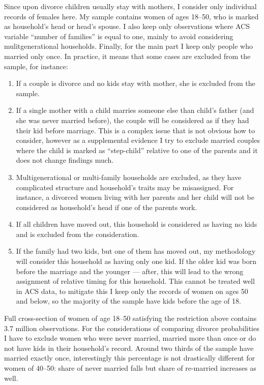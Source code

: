 \documentclass[12pt,letter]{article}
\begin{document}
Since upon divorce children usually stay with mothers, I consider only individual records of females here. My sample contains women of ages 18--50, who is marked as household's head or head's spouse. I also keep only observations where ACS  variable ``number of families'' is equal to one, mainly to avoid considering mulitgenerational households. Finally, for the main part I keep only people who married only once. In practice, it means that some cases are excluded from the sample, for instance:
\begin{enumerate}
\item If a couple is divorce and no kids stay with mother, she is excluded from the sample.
\item If a single mother with a child marries someone else than child's father (and she was never married before), the couple will be considered as if they had their kid before marriage. This is a complex issue that is not obvious how to consider, however as a supplemental evidence I try to exclude married couples where the child is marked as ``step-child'' relative to one of the parents and it does not change findings much.
\item Multigenerational or multi-family households are excluded, as they have complicated structure and household's traits may be misassigned. For instance, a divorced women living with her parents and her child will not be considered as household's head if one of the parents work. 
\item If all children have moved out, this household is considered as having no kids and is excluded from the consideration. 
\item If the family had two kids, but one of them has moved out, my methodology will consider this household as having only one kid. If the older kid was born before the marriage and the younger --- after, this will lead to the wrong assignment of relative timing for this household. This cannot be treated well in ACS data, to mitigate this I keep only the records of women on ages 50 and below, so the majority of the sample have kids before the age of 18. 
\end{enumerate}

Full cross-section of women of age 18--50 satisfying the restriction above contains 3.7 million observations. For the considerations of comparing divorce probabilities I have to exclude women who were never married, married more than once or do not have kids in their household's record. Around two thirds of the sample have married exactly once, interestingly this percentage is not drastically different for women of 40--50: share of never married falls but share of re-married increases as well.
\end{document}
